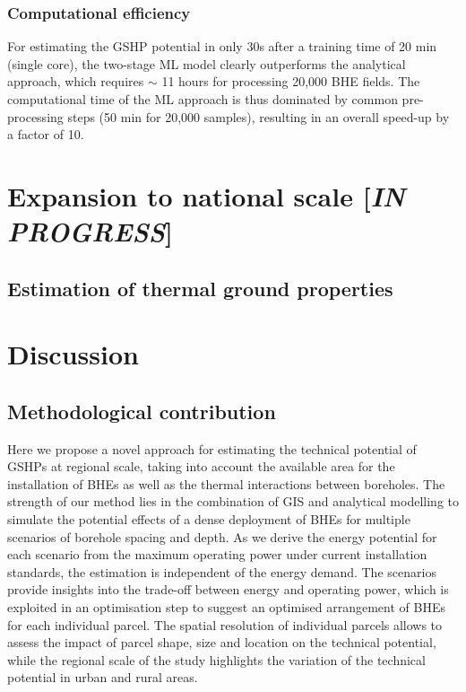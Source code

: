 \subsubsection{Computational efficiency}
For estimating the GSHP potential in only 30s after a training time of 20 min (single core), the two-stage ML model clearly outperforms the analytical approach, which requires 
$\sim$ 11 hours for processing 20,000 BHE fields. The computational time of the ML approach is thus dominated by common pre-processing steps (50 min for 20,000 samples), resulting in an overall speed-up by a factor of 10.

\section{Expansion to national scale [\textit{IN PROGRESS}]}

\subsection{Estimation of thermal ground properties}



\section{Discussion}
\label{discussion_BHE}

\subsection{Methodological contribution}

Here we propose a novel approach for estimating the technical potential of GSHPs at regional scale, taking into account the available area for the installation of BHEs as well as the thermal interactions between boreholes.
%
The strength of our method lies in the combination of GIS and analytical modelling to simulate the potential effects of a dense deployment of BHEs for multiple scenarios of borehole spacing and depth.
As we derive the energy potential for each scenario from the maximum operating power under current installation standards, the estimation is independent of the energy demand.
%
The scenarios provide insights into the trade-off between energy and operating power, which is exploited in an optimisation step to suggest an optimised arrangement of BHEs for each individual parcel. 
% 
The spatial resolution of individual parcels allows to assess the impact of parcel shape, size and location on the technical potential, while the regional scale of the study highlights the variation of the technical potential in urban and rural areas.

